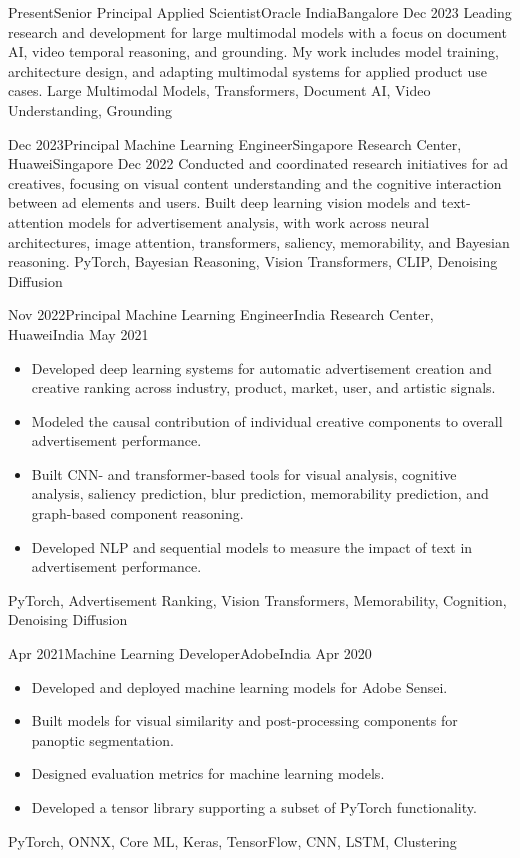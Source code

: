 \begin{experiences}
	\experience
	{Present}{Senior Principal Applied Scientist}{Oracle India}{Bangalore}
	{Dec 2023}{
		Leading research and development for large multimodal models with a focus on document AI, video temporal reasoning, and grounding. My work includes model training, architecture design, and adapting multimodal systems for applied product use cases.
	}
	{Large Multimodal Models, Transformers, Document AI, Video Understanding, Grounding}
	\emptySeparator

	\experience
	{Dec 2023}{Principal Machine Learning Engineer}{Singapore Research Center, Huawei}{Singapore}
	{Dec 2022}{
		Conducted and coordinated research initiatives for ad creatives, focusing on visual content understanding and the cognitive interaction between ad elements and users. Built deep learning vision models and text-attention models for advertisement analysis, with work across neural architectures, image attention, transformers, saliency, memorability, and Bayesian reasoning.
	}
	{PyTorch, Bayesian Reasoning, Vision Transformers, CLIP, Denoising Diffusion}
	\emptySeparator

	\experience
	{Nov 2022}{Principal Machine Learning Engineer}{India Research Center, Huawei}{India}
	{May 2021}{
		\begin{itemize}
			\item Developed deep learning systems for automatic advertisement creation and creative ranking across industry, product, market, user, and artistic signals.
			\item Modeled the causal contribution of individual creative components to overall advertisement performance.
			\item Built CNN- and transformer-based tools for visual analysis, cognitive analysis, saliency prediction, blur prediction, memorability prediction, and graph-based component reasoning.
			\item Developed NLP and sequential models to measure the impact of text in advertisement performance.
		\end{itemize}
	}
	{PyTorch, Advertisement Ranking, Vision Transformers, Memorability, Cognition, Denoising Diffusion}
	\emptySeparator

	\experience
	{Apr 2021}{Machine Learning Developer}{Adobe}{India}
	{Apr 2020}{
		\begin{itemize}
			\item Developed and deployed machine learning models for Adobe Sensei.
			\item Built models for visual similarity and post-processing components for panoptic segmentation.
			\item Designed evaluation metrics for machine learning models.
			\item Developed a tensor library supporting a subset of PyTorch functionality.
		\end{itemize}
	}
	{PyTorch, ONNX, Core ML, Keras, TensorFlow, CNN, LSTM, Clustering}
	\emptySeparator


\end{experiences}
